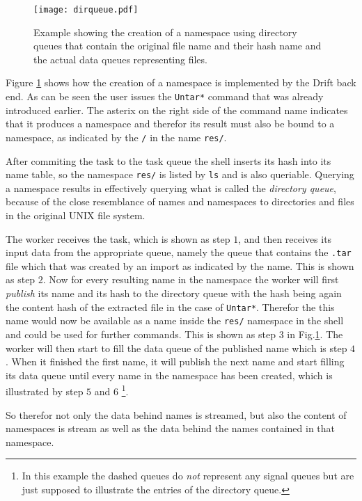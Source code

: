 \begin{figure}[h]
  \texttt{[image: dirqueue.pdf]}
  \caption{Example showing the creation of a namespace using
           directory queues that contain the original file name
           and their hash name and the actual data queues representing
           files.}
  \label{dirqueue}
\end{figure}

Figure \ref{dirqueue} shows how the creation of a namespace
is implemented by the Drift back end. As can be seen the user
issues the \texttt{Untar*} command that was already introduced
earlier. The asterix on the right side of the command name
indicates that it produces a namespace and therefor
its result must also be bound to a namespace, as indicated by
the \texttt{/} in the name \texttt{res/}.

After commiting the task to the task queue the shell inserts
its hash into its name table, so the namespace \texttt{res/}
is listed by \texttt{ls} and is also queriable. Querying a
namespace results in effectively querying what is called the
\textit{directory queue}, because of the close resemblance of
names and namespaces to directories and files in the original
UNIX file system.

The worker receives the task, which is shown as step $1$,
and then receives its input data from the appropriate queue,
namely the queue that contains the \texttt{.tar} file which
that was created by an import as indicated by the name. This
is shown as step $2$.
Now for every resulting name in the namespace the worker will
first \textit{publish} its name and its hash to the directory
queue with the hash being again the content hash of the extracted
file in the case of \texttt{Untar*}. Therefor the this name would
now be available as a name inside the \texttt{res/} namespace
in the shell and could be used for further commands. This is shown
as step $3$ in Fig.\ref{dirqueue}. The worker
will then start to fill the data queue of the published name which
is step $4$.
When it finished the first name, it will publish the next name
and start filling its data queue until every name in the namespace
has been created, which is illustrated by step $5$ and $6$
\footnote{In this example the dashed queues do \textit{not} represent any
signal queues but are just supposed to illustrate the entries
of the directory queue.}.

So therefor not only the data behind names is streamed, but also
the content of namespaces is stream as well as the data behind the
names contained in that namespace.
\newline

